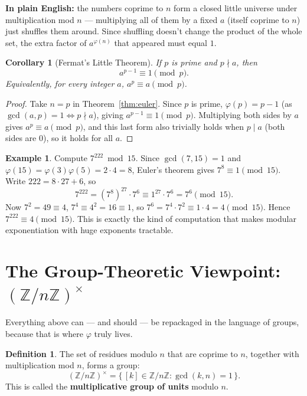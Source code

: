 \documentclass[11pt]{article}
\newtheorem{corollary}[theorem]{Corollary}
\theoremstyle{definition}
\newtheorem{definition}[theorem]{Definition}
\newtheorem{example}[theorem]{Example}
\theoremstyle{remark}
\newcommand{\Z}{\mathbb{Z}}
\begin{document}
\noindent\textbf{In plain English:} the numbers coprime to $n$ form a closed little universe under multiplication mod $n$ — multiplying all of them by a fixed $a$ (itself coprime to $n$) just shuffles them around. Since shuffling doesn't change the product of the whole set, the extra factor of $a^{\varphi(n)}$ that appeared must equal $1$.

\begin{corollary}[Fermat's Little Theorem]\label{cor:flt}
If $p$ is prime and $p \nmid a$, then
\[
a^{p-1} \equiv 1 \pmod p.
\]
Equivalently, for \emph{every} integer $a$, $a^p \equiv a \pmod p$.
\end{corollary}

\begin{proof}
Take $n = p$ in Theorem~\ref{thm:euler}. Since $p$ is prime, $\varphi(p) = p - 1$ (as $\gcd(a,p)=1 \iff p \nmid a$), giving $a^{p-1}\equiv 1 \pmod p$. Multiplying both sides by $a$ gives $a^p \equiv a \pmod p$, and this last form also trivially holds when $p \mid a$ (both sides are $0$), so it holds for all $a$.
\end{proof}

\begin{example}
Compute $7^{222} \bmod 15$. Since $\gcd(7,15)=1$ and $\varphi(15) = \varphi(3)\varphi(5) = 2\cdot4 = 8$, Euler's theorem gives $7^8 \equiv 1 \pmod{15}$. Write $222 = 8\cdot 27 + 6$, so
\[
7^{222} = (7^8)^{27}\cdot 7^6 \equiv 1^{27}\cdot 7^6 = 7^6 \pmod{15}.
\]
Now $7^2 = 49 \equiv 4$, $7^4 \equiv 4^2 = 16 \equiv 1$, so $7^6 = 7^4\cdot 7^2 \equiv 1\cdot 4 = 4 \pmod{15}$.
Hence $7^{222}\equiv 4 \pmod{15}$. This is exactly the kind of computation that makes modular exponentiation with huge exponents tractable.
\end{example}

\section{The Group-Theoretic Viewpoint: $(\Z/n\Z)^\times$}

Everything above can — and should — be repackaged in the language of groups, because that is where $\varphi$ truly lives.

\begin{definition}
The set of residues modulo $n$ that are coprime to $n$, together with multiplication mod $n$, forms a group:
\[
(\Z/n\Z)^\times = \{\, [k] \in \Z/n\Z : \gcd(k,n)=1 \,\}.
\]
This is called the \textbf{multiplicative group of units} modulo $n$.
\end{definition}
\end{document}
